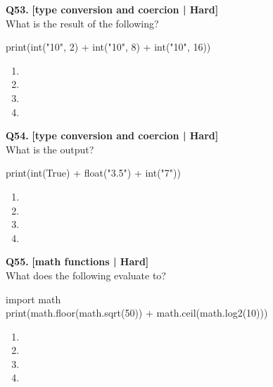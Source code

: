 \noindent\textbf{Q53.} \hfill {\small\color{LPUOrange}\textbf{[type conversion and coercion | Hard]}}\\[2pt]
What is the result of the following? 

\begin{pycode}
print(int("10", 2) + int("10", 8) + int("10", 16))
\end{pycode}

\begin{enumerate}[label=(\alph*),topsep=2pt,itemsep=1pt,partopsep=0pt,parsep=0pt]
    \item {}
    \item {}
    \item {}
    \item {}
\end{enumerate}
\vspace{2mm}

\noindent\textbf{Q54.} \hfill {\small\color{LPUOrange}\textbf{[type conversion and coercion | Hard]}}\\[2pt]
What is the output? 

\begin{pycode}
print(int(True) + float("3.5") + int("7"))
\end{pycode}

\begin{enumerate}[label=(\alph*),topsep=2pt,itemsep=1pt,partopsep=0pt,parsep=0pt]
    \item {}
    \item {}
    \item {}
    \item {}
\end{enumerate}
\vspace{2mm}

\noindent\textbf{Q55.} \hfill {\small\color{LPUOrange}\textbf{[math functions | Hard]}}\\[2pt]
What does the following evaluate to? 

\begin{pycode}
import math\\
print(math.floor(math.sqrt(50)) + math.ceil(math.log2(10)))
\end{pycode}

\begin{enumerate}[label=(\alph*),topsep=2pt,itemsep=1pt,partopsep=0pt,parsep=0pt]
    \item {}
    \item {}
    \item {}
    \item {}
\end{enumerate}
\vspace{2mm}

